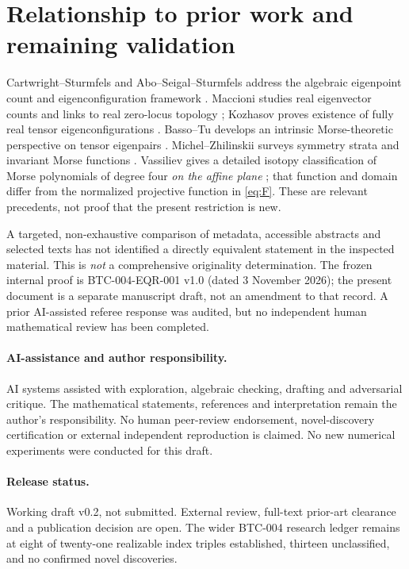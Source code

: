 \documentclass[10pt,a4paper]{article}
\theoremstyle{plain}
\theoremstyle{remark}
\begin{document}
\section{Relationship to prior work and remaining validation}
Cartwright--Sturmfels and Abo--Seigal--Sturmfels address the algebraic eigenpoint count and eigenconfiguration framework \cite{cartwright2013,abo2017}. Maccioni studies real eigenvector counts and links to real zero-locus topology \cite{maccioni2018}; Kozhasov proves existence of fully real tensor eigenconfigurations \cite{kozhasov2018}. Basso--Tu develops an intrinsic Morse-theoretic perspective on tensor eigenpairs \cite{bassotu2020}. Michel--Zhilinskii surveys symmetry strata and invariant Morse functions \cite{michel2001}. Vassiliev gives a detailed isotopy classification of Morse polynomials of degree four \emph{on the affine plane} \cite{vassiliev2025}; that function and domain differ from the normalized projective function in \eqref{eq:F}. These are relevant precedents, not proof that the present restriction is new.

A targeted, non-exhaustive comparison of metadata, accessible abstracts and selected texts has not identified a directly equivalent statement in the inspected material. This is \emph{not} a comprehensive originality determination. The frozen internal proof is BTC-004-EQR-001 v1.0 (dated 3 November 2026); the present document is a separate manuscript draft, not an amendment to that record. A prior AI-assisted referee response was audited, but no independent human mathematical review has been completed.

\paragraph{AI-assistance and author responsibility.} AI systems assisted with exploration, algebraic checking, drafting and adversarial critique. The mathematical statements, references and interpretation remain the author's responsibility. No human peer-review endorsement, novel-discovery certification or external independent reproduction is claimed. No new numerical experiments were conducted for this draft.

\paragraph{Release status.} Working draft v0.2, not submitted. External review, full-text prior-art clearance and a publication decision are open. The wider BTC-004 research ledger remains at eight of twenty-one realizable index triples established, thirteen unclassified, and no confirmed novel discoveries.
\end{document}
